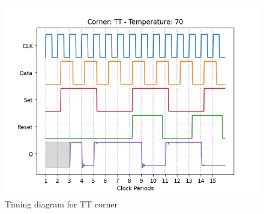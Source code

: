 \begin{figure}[H]
    \centering
    \begin{minipage}{0.5\textwidth}
        \centering
        \includegraphics[width=\textwidth]{Figures/Aimspice_Plots/TT_70.png}
        \caption{Timing diagram for TT corner}
        \label{fig:TT70}
    \end{minipage}%
\end{figure}

